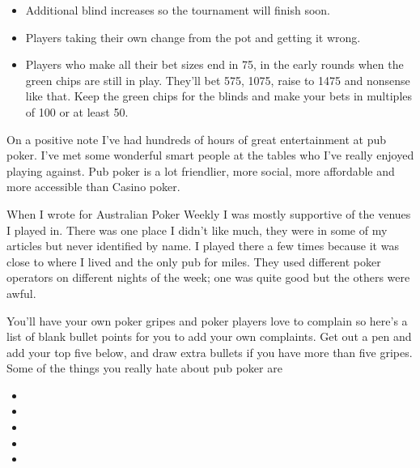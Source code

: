 \begin{itemize}
\item Additional blind increases so the tournament will finish soon.

\item Players taking their own change from the pot and getting it wrong.

\item Players who make all their bet sizes end in 75, in the early rounds
when the green chips are still in play. They'll bet 575, 1075, raise
to 1475 and nonsense like that. Keep the green chips for the blinds
and make your bets in multiples of 100 or at least 50.

\end{itemize}

On a positive note I've
had hundreds of hours of great entertainment at pub poker. I've
met some wonderful smart people at the tables who I've really enjoyed
playing against. Pub poker is a lot friendlier, more social, more
affordable and more accessible than Casino poker.

When I wrote for Australian Poker Weekly I was mostly supportive of
the venues I played in. There was one place I didn't like much, they
were in some of my articles but never identified by name. I played
there a few times because it was close to where I lived and the only
pub for miles. They used different poker operators on different nights
of the week; one was quite good but the others were awful.

You'll have your own poker gripes and poker players love to complain
so here's a list of blank bullet points for you to add your own
complaints. Get out a pen and add your top five below, and draw extra
bullets if you have more than five gripes. Some of the things you
really hate about pub poker are

\begin{itemize}

\item


\item


\item


\item


\item


\end{itemize}
